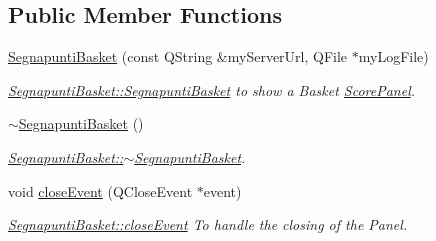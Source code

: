 \subsection*{Public Member Functions}
\begin{DoxyCompactItemize}
\item 
\mbox{\hyperlink{classSegnapuntiBasket_aeaee10f4af8caa073e2b7016999d7c45}{Segnapunti\+Basket}} (const Q\+String \&my\+Server\+Url, Q\+File $\ast$my\+Log\+File)
\begin{DoxyCompactList}\small\item\em \mbox{\hyperlink{classSegnapuntiBasket_aeaee10f4af8caa073e2b7016999d7c45}{Segnapunti\+Basket\+::\+Segnapunti\+Basket}} to show a Basket \mbox{\hyperlink{classScorePanel}{Score\+Panel}}. \end{DoxyCompactList}\item 
\mbox{\label{classSegnapuntiBasket_ac612f5446cda2b2225bc3bd5da73ed43}} 
\mbox{\hyperlink{classSegnapuntiBasket_ac612f5446cda2b2225bc3bd5da73ed43}{$\sim$\+Segnapunti\+Basket}} ()
\begin{DoxyCompactList}\small\item\em \mbox{\hyperlink{classSegnapuntiBasket_ac612f5446cda2b2225bc3bd5da73ed43}{Segnapunti\+Basket\+::$\sim$\+Segnapunti\+Basket}}. \end{DoxyCompactList}\item 
void \mbox{\hyperlink{classSegnapuntiBasket_a6b92efc36a2ec2057f1abce069fe870d}{close\+Event}} (Q\+Close\+Event $\ast$event)
\begin{DoxyCompactList}\small\item\em \mbox{\hyperlink{classSegnapuntiBasket_a6b92efc36a2ec2057f1abce069fe870d}{Segnapunti\+Basket\+::close\+Event}} To handle the closing of the Panel. \end{DoxyCompactList}\end{DoxyCompactItemize}
